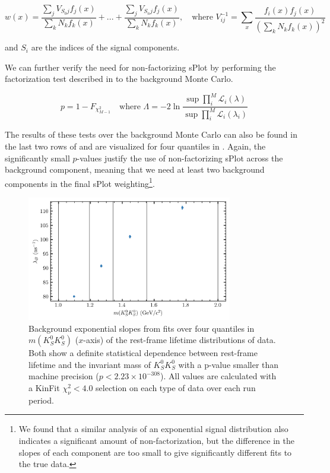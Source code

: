 \begin{equation}
  w(x) = \frac{\sum_{j} V_{S_0 j}f_j(x)}{\sum_{k}N_kf_k(x)} + ... + \frac{\sum_{j} V_{S_n j}f_j(x)}{\sum_{k}N_kf_k(x)},\quad \text{where } V_{ij}^{-1} = \sum_{x} \frac{f_i(x)f_j(x)}{\left(\sum_{k} N_kf_k(x)\right)^2}
  \label{eq:splot-weights-factorizing}
\end{equation}

and $S_i$ are the indices of the signal components.

We can further verify the need for non-factorizing sPlot by performing the factorization test described in  to the background Monte Carlo.

\begin{equation}
  p = 1 - F_{\chi^2_{M-1}} \quad\text{where }\Lambda = -2\ln\frac{\sup\prod_i^M \mathcal{L}_i(\lambda)}{\sup\prod_i^M \mathcal{L}_i(\lambda_i)}
  \label{eq:independence-test-mc}
\end{equation}

The results of these tests over the background Monte Carlo can also be found in the last two rows of  and are visualized for four quantiles in . Again, the significantly small $p$-values justify the use of non-factorizing sPlot across the background component, meaning that we need at least two background components in the final sPlot weighting\footnote{We found that a similar analysis of an exponential signal distribution also indicates a significant amount of non-factorization, but the difference in the slopes of each component are too small to give significantly different fits to the true data.}.


\begin{figure}
  \begin{center}
    \includegraphics[width=0.8\textwidth]{figures/factorization_plot_data_chisqdof_4.0_4_quantiles.png}
  \end{center}
  \caption{Background exponential slopes from fits over four quantiles in $m(K_S^0K_S^0)$ ($x$-axis) of the rest-frame lifetime distributions of data. Both show a definite statistical dependence between rest-frame lifetime and the invariant mass of $K_S^0K_S^0$ with a p-value smaller than machine precision ($p < 2.23 \times 10^{-308}$). All values are calculated with a KinFit $\chi^2_\nu < 4.0$ selection on each type of data over each run period.}\label{fig:factorization}
\end{figure}

